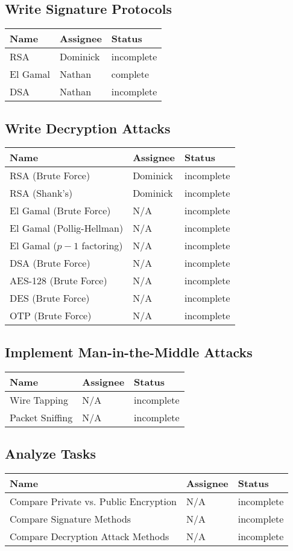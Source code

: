 \documentclass{report}
\begin{document}
\subsection{Write Signature Protocols}
\begin{tabular}{l|l|l}
    Name & Assignee & Status \\ \hline
    RSA & Dominick & incomplete \\
    El Gamal & Nathan & complete \\
    DSA & Nathan & incomplete	 
\end{tabular}

\subsection{Write Decryption Attacks}
\begin{tabular}{l|l|l}
    Name & Assignee & Status \\ \hline
    RSA (Brute Force) & Dominick & incomplete \\
    RSA (Shank's) & Dominick & incomplete \\
    El Gamal (Brute Force) & N/A & incomplete \\
    El Gamal (Pollig-Hellman) & N/A & incomplete \\
    El Gamal ($p-1$ factoring) & N/A & incomplete \\
    DSA (Brute Force) & N/A & incomplete \\
    AES-128 (Brute Force) & N/A & incomplete \\
    DES (Brute Force) & N/A & incomplete \\
    OTP (Brute Force) & N/A & incomplete 
\end{tabular}

\subsection{Implement Man-in-the-Middle Attacks}
\begin{tabular}{l|l|l}
    Name & Assignee & Status \\ \hline
    Wire Tapping & N/A & incomplete \\
    Packet Sniffing & N/A & incomplete 
\end{tabular}

\subsection{Analyze Tasks}
\begin{tabular}{l|l|l}
    Name & Assignee & Status \\ \hline
    Compare Private vs. Public Encryption & N/A & incomplete \\
    Compare Signature Methods & N/A & incomplete \\
    Compare Decryption Attack Methods & N/A & incomplete
\end{tabular}
\end{document}
